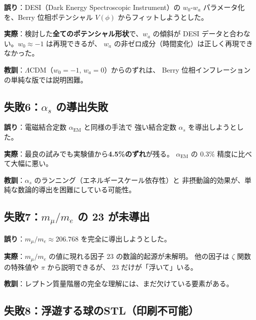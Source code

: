 \begin{warningbox}[失敗5: 状態方程式のフィット]
\textbf{誤り}：DESI（Dark Energy Spectroscopic Instrument）の $w_0$-$w_a$
パラメータ化を、Berry 位相ポテンシャル $V(\phi)$ からフィットしようとした。

\medskip
\textbf{実際}：検討した\textbf{全てのポテンシャル形状}で、$w_a$ の傾斜が
DESI データと合わない。$w_0 \approx -1$ は再現できるが、
$w_a$ の非ゼロ成分（時間変化）は正しく再現できなかった。

\medskip
\textbf{教訓}：$\Lambda$CDM（$w_0 = -1$, $w_a = 0$）からのずれは、
Berry 位相インフレーションの単純な版では説明困難。
\end{warningbox}

\subsection{失敗6：$\alpha_s$ の導出失敗}

\begin{warningbox}[失敗6: 強い結合定数]
\textbf{誤り}：電磁結合定数 $\alpha_{\mathrm{EM}}$ と同様の手法で
強い結合定数 $\alpha_s$ を導出しようとした。

\medskip
\textbf{実際}：最良の試みでも実験値から\textbf{4.5\%のずれ}が残る。
$\alpha_{\mathrm{EM}}$ の $0.3\%$ 精度に比べて大幅に悪い。

\medskip
\textbf{教訓}：$\alpha_s$ のランニング（エネルギースケール依存性）と
非摂動論的効果が、単純な数論的導出を困難にしている可能性。
\end{warningbox}

\subsection{失敗7：$m_\mu / m_e$ の 23 が未導出}

\begin{warningbox}[失敗7: ミュー粒子質量比の因子 23]
\textbf{誤り}：$m_\mu / m_e \approx 206.768$ を完全に導出しようとした。

\medskip
\textbf{実際}：$m_\mu / m_e$ の値に現れる因子 $23$ の数論的起源が未解明。
他の因子は $\zeta$ 関数の特殊値や $\pi$ から説明できるが、
$23$ だけが「浮いて」いる。

\medskip
\textbf{教訓}：レプトン質量階層の完全な理解には、まだ欠けている要素がある。
\end{warningbox}

\subsection{失敗8：浮遊する球のSTL（印刷不可能）}

